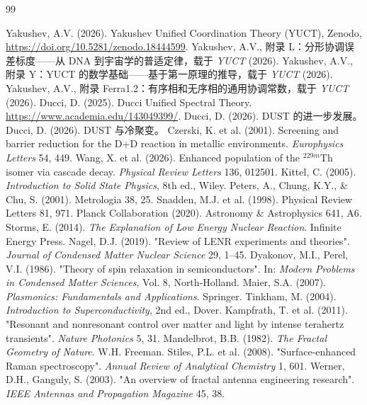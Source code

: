 \documentclass[12pt]{article}
\theoremstyle{remark}
\begin{document}
	\begin{thebibliography}{99}
		
		 Yakushev, A.V. (2026). Yakushev Unified Coordination Theory (YUCT), Zenodo, \url{https://doi.org/10.5281/zenodo.18444599}.
		 Yakushev, A.V., 附录 L：分形协调误差标度——从 DNA 到宇宙学的普适定律，载于 \emph{YUCT} (2026).
		 Yakushev, A.V., 附录 Y：YUCT 的数学基础——基于第一原理的推导，载于 \emph{YUCT} (2026).
		 Yakushev, A.V., 附录 Ferra1.2：有序相和无序相的通用协调常数，载于 \emph{YUCT} (2026).
		 Ducci, D. (2025). Ducci Unified Spectral Theory. \url{https://www.academia.edu/143049399/}.
		 Ducci, D. (2026). DUST 的进一步发展。
		 Ducci, D. (2026). DUST 与冷聚变。
		 Czerski, K. et al. (2001). Screening and barrier reduction for the D+D reaction in metallic environments. \textit{Europhysics Letters} 54, 449.
		 Wang, X. et al. (2026). Enhanced population of the \(^{229m}\)Th isomer via cascade decay. \textit{Physical Review Letters} 136, 012501.
		 Kittel, C. (2005). \textit{Introduction to Solid State Physics}, 8th ed., Wiley.
		 Peters, A., Chung, K.Y., \& Chu, S. (2001). Metrologia 38, 25.
		 Snadden, M.J. et al. (1998). Physical Review Letters 81, 971.
		 Planck Collaboration (2020). Astronomy \& Astrophysics 641, A6.
		 Storms, E. (2014). \textit{The Explanation of Low Energy Nuclear Reaction}. Infinite Energy Press.
		 Nagel, D.J. (2019). "Review of LENR experiments and theories". \textit{Journal of Condensed Matter Nuclear Science} 29, 1–45.
		 Dyakonov, M.I., Perel, V.I. (1986). "Theory of spin relaxation in semiconductors". In: \textit{Modern Problems in Condensed Matter Sciences}, Vol. 8, North‑Holland.
		 Maier, S.A. (2007). \textit{Plasmonics: Fundamentals and Applications}. Springer.
		 Tinkham, M. (2004). \textit{Introduction to Superconductivity}, 2nd ed., Dover.
		 Kampfrath, T. et al. (2011). "Resonant and nonresonant control over matter and light by intense terahertz transients". \textit{Nature Photonics} 5, 31.
		 Mandelbrot, B.B. (1982). \textit{The Fractal Geometry of Nature}. W.H. Freeman.
		 Stiles, P.L. et al. (2008). "Surface-enhanced Raman spectroscopy". \textit{Annual Review of Analytical Chemistry} 1, 601.
		 Werner, D.H., Ganguly, S. (2003). "An overview of fractal antenna engineering research". \textit{IEEE Antennas and Propagation Magazine} 45, 38.
	\end{thebibliography}
	
\end{document}

